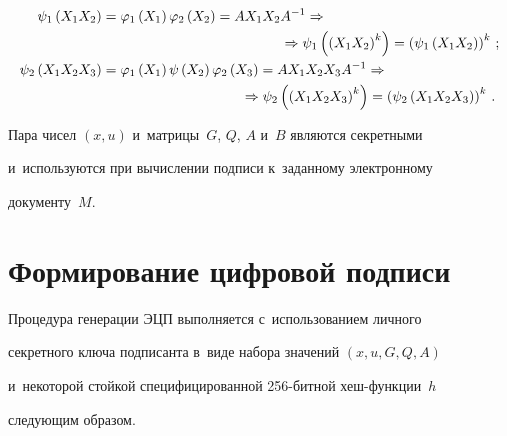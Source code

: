    \begin{align*}


   \psi_1\left(X_1X_2\right) &= \varphi_1\left(X_1\right) \varphi_2\left(X_2\right) 


=AX_1X_2A^{-1} \Rightarrow{}\\


&\hspace*{45mm}{}\Rightarrow \psi_1\left( \left( X_1X_2\right)^k\right) =\left( 


\psi_1\left( X_1X_2\right)\right)^k\,;\\


   \psi_2\left( X_1X_2X_3\right) &= \varphi_1\left( X_1\right) \psi\left( X_2\right) 


\varphi_2\left( X_3\right) =AX_1X_2X_3A^{-1} \Rightarrow {}\\


&\hspace*{35mm}{}\Rightarrow


   \psi_2\left( \left( X_1X_2X_3\right)^k\right) =\left( \psi_2\left( 


X_1X_2X_3\right)\right)^k\,.


   \end{align*}


   


   Пара чисел $(x,u)$ и~матрицы~$G$, $Q$, $A$ и~$B$ являются секретными 


   и~используются при вычислении подписи к~заданному электронному 


документу~$M$. 


   


\section{Формирование цифровой подписи}





   Процедура генерации ЭЦП выполняется с~использованием личного 


секретного ключа подписанта в~виде набора значений $(x,u,G,Q,A)$ 


и~некоторой стойкой специфицированной 256-бит\-ной хеш-функ\-ции~$h$ 


следующим образом.


